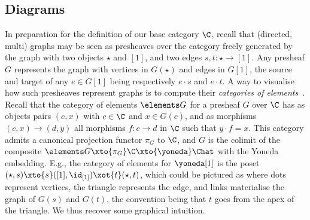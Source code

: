 \documentclass{LMCS}
\theoremstyle{plain}\newtheorem{satz}[thm]{Satz}
\begin{document}
\subsection{Diagrams}\label{subsec:diagrams}
In preparation for the definition of our base category $\C$, recall
that (directed, multi) graphs may be seen as presheaves over the
category freely generated by the graph with two objects $\star$ and
$[1]$, and two edges $s,t \colon \star \to [1]$. Any presheaf $G$
represents the graph with vertices in $G(\star)$ and edges in $G[1]$,
the source and target of any $e \in G[1]$ being respectively $e \cdot
s$ and $e \cdot t$. A way to visualise how such presheaves represent
graphs is to compute their \emph{categories of
  elements}~\cite{MM}. Recall that the category of elements $\elements G$
for a presheaf $G$ over $\C$ has as objects pairs $(c,x)$ with $c \in
\C$ and $x \in G(c)$, and as morphisms $(c,x) \to (d,y)$ all morphisms
$f \colon c \to d$ in $\C$ such that $y \cdot f = x$. This category
admits a canonical projection functor $\pi_G$ to $\C$, and $G$ is the colimit of
the composite $\elements G \xto{\pi_G} \C \xto{\yoneda} \Chat$ with the
Yoneda embedding. E.g., the category of elements for $\yoneda[1]$ is
the poset $(\star, s) \xto{s} ([1],\id_{[1]}) \xot{t} (\star, t)$,
which could be pictured as
 \hspace*{-.7em} where dots represent vertices, the triangle
represents the edge, and links materialise the graph of $G(s)$ and
$G(t)$, the convention being that $t$ goes from the apex of the
triangle.  We thus recover some graphical intuition.
\end{document}
